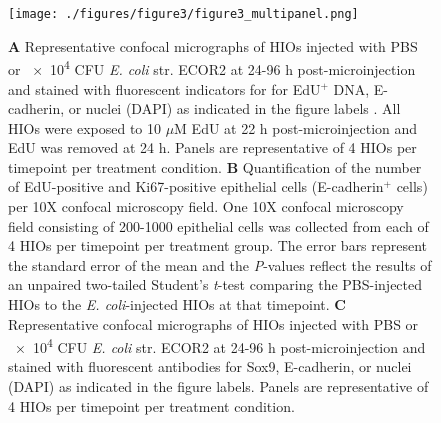 \documentclass[9pt,lineo]{elife}
\begin{document}
\begin{figure}
\begin{fullwidth}
\centering
\texttt{[image: ./figures/figure3/figure3\_multipanel.png]}
\caption{\textbf{A} Representative confocal micrographs of HIOs injected with PBS or \num{e4} CFU \textit{E. coli} str. ECOR2 at 24-96 h post-microinjection and stained with fluorescent indicators for for EdU$^{+}$ DNA, E-cadherin, or nuclei (DAPI) as indicated in the figure labels . All HIOs were exposed to 10 $\mu$M EdU at 22 h post-microinjection and EdU was removed at 24 h. Panels are representative of 4 HIOs per timepoint per treatment condition. \textbf{B} Quantification of the number of EdU-positive and Ki67-positive epithelial cells (E-cadherin$^{+}$ cells) per 10X confocal microscopy field. One 10X confocal microscopy field consisting of 200-1000 epithelial cells was collected from each of 4 HIOs per timepoint per treatment group. The error bars represent the standard error of the mean and the \textit{P}-values reflect the results of an unpaired two-tailed Student's \textit{t}-test comparing the PBS-injected HIOs to the \textit{E. coli}-injected HIOs at that timepoint. \textbf{C} Representative confocal micrographs of HIOs injected with PBS or \num{e4} CFU \textit{E. coli} str. ECOR2 at 24-96 h post-microinjection and stained with fluorescent antibodies for Sox9, E-cadherin, or nuclei (DAPI) as indicated in the figure labels. Panels are representative of 4 HIOs per timepoint per treatment condition.}
\label{fig:fullwidth}
\end{fullwidth}
\end{figure}
\end{document}
